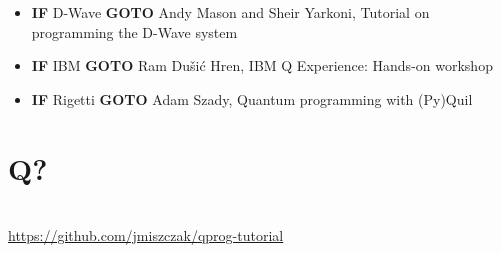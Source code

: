 \documentclass{beamer}
\begin{document}
\begin{frame}{\insertsection}
	\begin{itemize}
		\item \textbf{IF} D-Wave \textbf{GOTO} Andy Mason and Sheir Yarkoni, 
		Tutorial on 
		programming the D-Wave system
		\item \textbf{IF} IBM \textbf{GOTO} Ram Du\v{s}i\'c Hren, IBM Q 
		Experience: Hands-on workshop
		\item \textbf{IF} Rigetti \textbf{GOTO} Adam Szady, Quantum programming 
		with (Py)Quil
	\end{itemize}
\end{frame}

\section{Q?}
\begin{frame}{\insertsection}
    \begin{center}
        \Huge {\color{iitis-orange} \insertsection}\\[12pt]
        \large \url{https://github.com/jmiszczak/qprog-tutorial}
    \end{center}
\end{frame}
\end{document}
